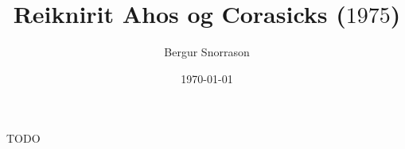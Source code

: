 \title{Reiknirit Ahos og Corasicks ($1975$)}
\author{Bergur Snorrason}
\date{\today}



\frame{\titlepage}

{
	{
		\item<1-> TODO
	}
}

{
}


